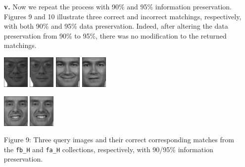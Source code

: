 \documentclass[ 12pt ]{article}
\begin{document}
\begin{enumerate}
\begin{enumerate}
            \item[\textbf{v.}] Now we repeat the process with 90\% and 95\% information preservation. Figures 9 and 10 illustrate three correct and incorrect matchings, respectively,
                with both 90\% and 95\% data preservation. Indeed, after altering the data preservation from 90\% to 95\%, there was no modification to the returned matchings.
                \begin{center}
                    \includegraphics[scale=1.7]{f_h_images/AnyConv.com__00182_940422_fb_a}
                    \includegraphics[scale=1.7]{f_h_images/AnyConv.com__00182_940422_fa_a}
                    \includegraphics[scale=1.7]{f_h_images/AnyConv.com__00753_941201_fb}
                    \includegraphics[scale=1.7]{f_h_images/AnyConv.com__00753_941201_fa}
                \end{center}
                \begin{center}
                    \includegraphics[scale=1.7]{f_h_images/AnyConv.com__00501_940519_fb}
                    \includegraphics[scale=1.7]{f_h_images/AnyConv.com__00501_940519_fa}
                \end{center}
                \begin{center}
                    \scriptsize
                    Figure 9: Three query images and their correct corresponding matches from the \verb|fb_H| and \verb|fa_H| collections, respectively, with 90/95\%
                    information preservation.
                \end{center}
                \newpage


\end{enumerate}
\end{enumerate}
\end{document}
